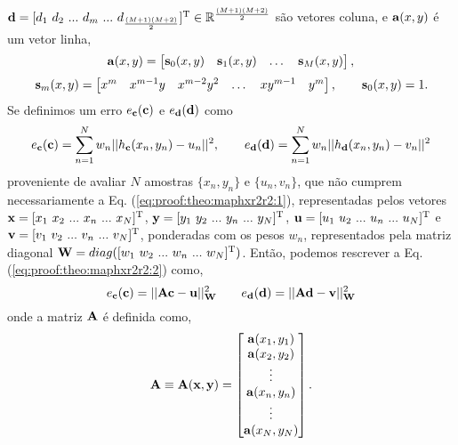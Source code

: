 \begin{myproofT}
$\VECTOR{d}=[d_1~ d_2~ ...~ d_m~ ...~ d_{\frac{(M+1)(M+2)}{2}}]^{\transpose} \in \mathbb{R}^{\frac{(M+1)(M+2)}{2}}$ 
são vetores coluna, e
$\VECTOR{a}(x,y)$ é um vetor linha,
\begin{equation}
\VECTOR{a}(x,y)= 
\begin{bmatrix}
\VECTOR{s}_{0}(x,y) & \VECTOR{s}_{1}(x,y) &  \dots  & \VECTOR{s}_{M}(x,y)
\end{bmatrix},
\end{equation}
\begin{equation}
\VECTOR{s}_{m}(x,y)=
\begin{bmatrix}
x^m  & x^{m-1} y  & x^{m-2} y^2    & \dots  & x y^{m-1} &  y^m 
\end{bmatrix},
\qquad
\VECTOR{s}_{0}(x,y)=1.
\end{equation}
Se definimos um erro $e_{\VECTOR{c}}(\VECTOR{c})$ e $e_{\VECTOR{d}}(\VECTOR{d})$ como
\begin{equation}\label{eq:proof:theo:maphxr2r2:2}
e_{\VECTOR{c}}(\VECTOR{c}) 
=  
\sum_{n=1}^{N} w_n||h_{\VECTOR{c}}(x_n,y_n)-u_n||^2,
\qquad
e_{\VECTOR{d}}(\VECTOR{d}) 
=  
\sum_{n=1}^{N} w_n||h_{\VECTOR{d}}(x_n,y_n)-v_n||^2 
\end{equation}
proveniente de avaliar $N$ amostras $\{x_n,y_n\}$ e $\{u_n,v_n\}$, 
que não cumprem necessariamente a Eq. (\ref{eq:proof:theo:maphxr2r2:1}), 
representadas pelos vetores 
$\VECTOR{x}=[x_1~ x_2~ ...~ x_n~ ...~ x_N]^{\transpose}$,
$\VECTOR{y}=[y_1~ y_2~ ...~ y_n~ ...~ y_N]^{\transpose}$, 
$\VECTOR{u}=[u_1~ u_2~ ...~ u_n~ ...~ u_N]^{\transpose}$ e
$\VECTOR{v}=[v_1~ v_2~ ...~ v_n~ ...~ v_N]^{\transpose}$,
ponderadas com os pesos $w_n$, representados pela matriz diagonal $\MATRIX{W}=\funcdiag([w_1~ w_2~ ...~ w_n~ ...~ w_N]^{\transpose})$.
Então, podemos rescrever a Eq. (\ref{eq:proof:theo:maphxr2r2:2}) como,
\begin{equation}\label{eq:proof:theo:maphxr2r2:3}
e_{\VECTOR{c}}(\VECTOR{c}) = ||\MATRIX{A}\VECTOR{c}-\VECTOR{u}||_{\MATRIX{W}}^2 
\qquad
e_{\VECTOR{d}}(\VECTOR{d}) = ||\MATRIX{A}\VECTOR{d}-\VECTOR{v}||_{\MATRIX{W}}^2 
\end{equation}
onde a matriz $\MATRIX{A}$ é definida como,
\begin{equation}\label{eq:proof:maphxr2r2:4}
\MATRIX{A}\equiv \MATRIX{A}(\VECTOR{x},\VECTOR{y})=\begin{bmatrix}
\VECTOR{a}(x_1,y_1)\\
\VECTOR{a}(x_2,y_2)\\
\vdots\\
\VECTOR{a}(x_n,y_n)\\
\vdots\\
\VECTOR{a}(x_N,y_N)
\end{bmatrix}.
\end{equation}



\end{myproofT}
